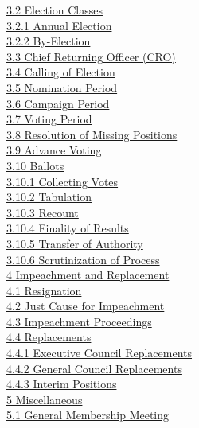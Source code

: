 \documentclass{article}
\begin{document}
\indent \hyperref[sec:3.2]{3.2 Election Classes} \\
\indent \indent \hyperref[sec:3.2.1]{3.2.1 Annual Election} \\
\indent \indent \hyperref[sec:3.2.2]{3.2.2 By-Election} \\
\indent \hyperref[sec:3.3]{3.3 Chief Returning Officer (CRO)} \\
\indent \hyperref[sec:3.4]{3.4 Calling of Election} \\
\indent \hyperref[sec:3.5]{3.5 Nomination Period} \\
\indent \hyperref[sec:3.6]{3.6 Campaign Period} \\
\indent \hyperref[sec:3.7]{3.7 Voting Period} \\
\indent \hyperref[sec:3.8]{3.8 Resolution of Missing Positions} \\
\indent \hyperref[sec:3.9]{3.9 Advance Voting} \\
\indent \hyperref[sec:3.10]{3.10 Ballots} \\
\indent \indent \hyperref[sec:3.10.1]{3.10.1 Collecting Votes} \\
\indent \indent \hyperref[sec:3.10.2]{3.10.2 Tabulation} \\
\indent \indent \hyperref[sec:3.10.3]{3.10.3 Recount} \\
\indent \indent \hyperref[sec:3.10.4]{3.10.4 Finality of Results} \\
\indent \indent \hyperref[sec:3.10.5]{3.10.5 Transfer of Authority} \\
\indent \indent \hyperref[sec:3.10.6]{3.10.6 Scrutinization of Process} \\
\hyperref[sec:4]{4 Impeachment and Replacement} \\
\indent \hyperref[sec:4.1]{4.1 Resignation} \\
\indent \hyperref[sec:4.2]{4.2 Just Cause for Impeachment} \\
\indent \hyperref[sec:4.3]{4.3 Impeachment Proceedings} \\
\indent \hyperref[sec:4.4]{4.4 Replacements} \\  
\indent \indent \hyperref[sec:4.4.1]{4.4.1 Executive Council Replacements} \\
\indent \indent \hyperref[sec:4.4.2]{4.4.2 General Council Replacements}  \\
\indent \indent \hyperref[sec:4.4.3]{4.4.3 Interim Positions}  \\
\hyperref[sec:5]{5 Miscellaneous}  \\
\indent \hyperref[sec:5.1]{5.1 General Membership Meeting}  \\
\end{document}
